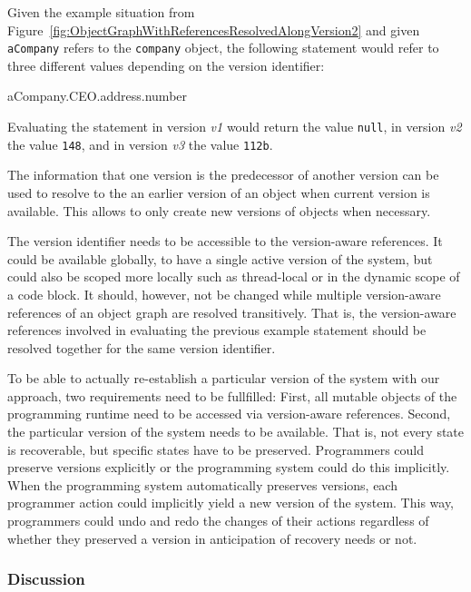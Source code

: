Given the example situation from Figure~\ref{fig:ObjectGraphWithReferencesResolvedAlongVersion2} and given \lstinline{aCompany} refers to the \lstinline{company} object, the following statement would refer to three different values depending on the version identifier:

\begin{code}{}{}
aCompany.CEO.address.number
\end{code}
\iffalse
\end{verbatim}\fi

Evaluating the statement in version \emph{v1} would return the value \lstinline{null}, in version \emph{v2} the value \lstinline{148}, and in version \emph{v3} the value \lstinline{112b}.

The information that one version is the predecessor of another version can be used to resolve to the an earlier version of an object when current version is available.
This allows to only create new versions of objects when necessary.

The version identifier needs to be accessible to the version-aware references.
It could be available globally, to have a single active version of the system, but could also be scoped more locally such as thread-local or in the dynamic scope of a code block.
It should, however, not be changed while multiple version-aware references of an object graph are resolved transitively.
That is, the version-aware references involved in evaluating the previous example statement should be resolved together for the same version identifier.

To be able to actually re-establish a particular version of the system with our approach, two requirements need to be fullfilled:
First, all mutable objects of the programming runtime need to be accessed via version-aware references.
Second, the particular version of the system needs to be available.
That is, not every state is recoverable, but specific states have to be preserved.
Programmers could preserve versions explicitly or the programming system could do this implicitly.
When the programming system automatically preserves versions, each programmer action could implicitly yield a new version of the system.
This way, programmers could undo and redo the changes of their actions regardless of whether they preserved a version in anticipation of recovery needs or not.

\subsubsection{Discussion}

